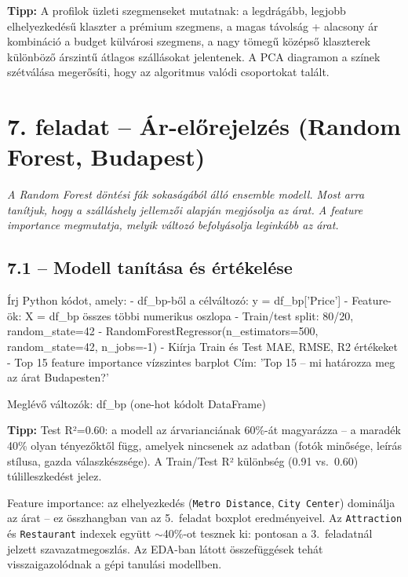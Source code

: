 \documentclass[11pt,a4paper]{article}
\newcommand{\tip}[1]{%
  \vspace{3pt}%
  \begin{tcolorbox}[tipstyle]%
  \textbf{\textcolor{tipborder}{Tipp:}} #1%
  \end{tcolorbox}\vspace{2pt}}
\begin{document}
\tip{A profilok üzleti szegmenseket mutatnak: a legdrágább, legjobb elhelyezkedésű klaszter a prémium szegmens,
a magas távolság + alacsony ár kombináció a budget külvárosi szegmens,
a nagy tömegű középső klaszterek különböző árszintű átlagos szállásokat jelentenek.
A PCA diagramon a színek szétválása megerősíti, hogy az algoritmus valódi csoportokat talált.}

\section{7. feladat -- Ár-előrejelzés (Random Forest, Budapest)}

\noindent\textit{A Random Forest döntési fák sokaságából álló ensemble modell.
Most arra tanítjuk, hogy a szálláshely jellemzői alapján megjósolja az árat.
A feature importance megmutatja, melyik változó befolyásolja leginkább az árat.}

\subsection{7.1 -- Modell tanítása és értékelése}

\begin{prompt}
Írj Python kódot, amely:
- df_bp-ből a célváltozó: y = df_bp['Price']
- Feature-ök: X = df_bp összes többi numerikus oszlopa
- Train/test split: 80/20, random_state=42
- RandomForestRegressor(n_estimators=500, random_state=42, n_jobs=-1)
- Kiírja Train és Test MAE, RMSE, R2 értékeket
- Top 15 feature importance vízszintes barplot
  Cím: 'Top 15 -- mi határozza meg az árat Budapesten?'

Meglévő változók: df_bp (one-hot kódolt DataFrame)
\end{prompt}

\tip{Test R²=0.60: a modell az árvarianciának 60\%-át magyarázza --
a maradék 40\% olyan tényezőktől függ, amelyek nincsenek az adatban
(fotók minősége, leírás stílusa, gazda válaszkészsége).
A Train/Test R² különbség (0.91 vs.\ 0.60) túlilleszkedést jelez.

Feature importance: az elhelyezkedés (\texttt{Metro Distance}, \texttt{City Center}) dominálja az árat --
ez összhangban van az 5.\ feladat boxplot eredményeivel.
Az \texttt{Attraction} és \texttt{Restaurant} indexek együtt $\sim$40\%-ot tesznek ki:
pontosan a 3.\ feladatnál jelzett szavazatmegoszlás.
Az EDA-ban látott összefüggések tehát visszaigazolódnak a gépi tanulási modellben.}
\end{document}

